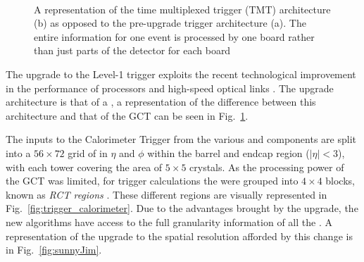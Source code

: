 \begin{figure}
  \centering
  ~~
   \\
  \caption{A representation of the time multiplexed trigger (TMT)
  architecture (b) as opposed to the pre-upgrade trigger architecture
  (a). The entire information for one event is processed by one board
  rather than just parts of the detector for each board \cite{1748-0221-9-10-C10034}}
  \label{fig:tmt}
\end{figure}

The upgrade to the Level-1 trigger exploits the recent technological
improvement in the performance of \FPGA processors and high-speed
optical links \cite{tp}. The upgrade architecture is that of a \TMT, a
representation of the difference between this architecture and that of
the \ac{GCT} can be seen in Fig.~\ref{fig:tmt}. 

The inputs to the Calorimeter Trigger from the various \ECAL and \HCAL
components are split into a $56\times 72$ grid of \TTs in $\eta$ and
$\phi$ within the barrel and endcap region ($|\eta|<3$), with each
tower covering the area of $5\times5$ \ECAL crystals.  As the
processing power of the \ac{GCT} was limited, for trigger calculations
the \TTs were grouped into $4\times4$ blocks, known as \emph{\ac{RCT}
regions} \cite{Khachatryan:2016bia}. These different regions are
visually represented in Fig.~\ref{fig:trigger_calorimeter}. Due to the
advantages brought by the upgrade, the new algorithms have access
to the full granularity information of all the \TTs. A representation
of the upgrade to the spatial resolution afforded by this change is
in Fig.~\ref{fig:sunnyJim}.

